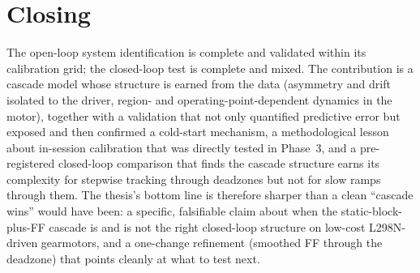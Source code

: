 \section{Closing}
\label{sec:concl-closing}

The open-loop system identification is complete and validated within its calibration grid; the closed-loop test is complete and mixed. The contribution is a cascade model whose structure is earned from the data (asymmetry and drift isolated to the driver, region- and operating-point-dependent dynamics in the motor), together with a validation that not only quantified predictive error but exposed and then confirmed a cold-start mechanism, a methodological lesson about in-session calibration that was directly tested in Phase~3, and a pre-registered closed-loop comparison that finds the cascade structure earns its complexity for stepwise tracking through deadzones but not for slow ramps through them. The thesis's bottom line is therefore sharper than a clean ``cascade wins'' would have been: a specific, falsifiable claim about when the static-block-plus-FF cascade is and is not the right closed-loop structure on low-cost L298N-driven gearmotors, and a one-change refinement (smoothed FF through the deadzone) that points cleanly at what to test next.
